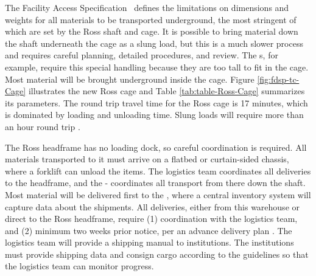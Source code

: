 The  Facility Access Specification~\cite{bib:docdb328} defines the limitations on dimensions and weights for all materials to be transported underground, the most stringent of which are set by the Ross shaft and cage. It is possible to bring material down the shaft underneath the cage as a slung load, but this is a much slower process and requires careful planning, detailed procedures, and review. The  s, for example, require this special handling because they are too tall to fit in the cage. Most material will be brought underground inside the cage. Figure \ref{fig:fdsp-tc-Cage} illustrates the new Ross cage and Table \ref{tab:table-Ross-Cage} summarizes its parameters.  The round trip travel time for the Ross cage is 17 minutes, which is dominated by loading and unloading time.  Slung loads will require more than an hour round trip .


The Ross headframe has no loading dock, so careful coordination is required. All materials transported to it must arrive on a flatbed or curtain-sided chassis, where a forklift can unload  the items. The logistics team coordinates all deliveries to the headframe, and the - coordinates all transport from there down the shaft.  Most material will be delivered first to the , where a central inventory system will capture data about the shipments.  All deliveries, either from this warehouse or direct to the Ross headframe, require (1) coordination with the logistics team, and (2) minimum two weeks prior notice, per an advance delivery plan .  The logistics team will provide a shipping manual  to  institutions. The institutions must provide shipping data and consign cargo according to the guidelines so that the logistics team can monitor progress. 



